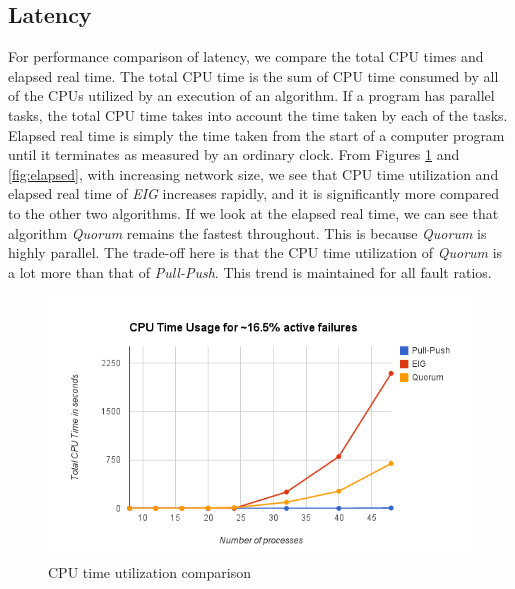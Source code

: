 \subsection{Latency}

For performance comparison of latency, we compare the total CPU times and elapsed real time.  The total CPU time is the sum of CPU time consumed by all of the CPUs utilized by an execution of an algorithm. If a program has parallel tasks, the total CPU time takes into account the time taken by each of the tasks. Elapsed real time is simply the time taken from the start of a computer program until it terminates as measured by an ordinary clock. From Figures \ref{fig:cpu} and \ref{fig:elapsed}, with increasing network size, we see that CPU time utilization and elapsed real time of \textit{EIG} increases rapidly, and it is significantly more compared to the other two algorithms. If we look at the elapsed real time, we can see that algorithm \textit{Quorum} remains the fastest throughout. This is because \textit{Quorum} is highly parallel. The trade-off here is that the CPU time utilization of \textit{Quorum} is a lot more than that of \textit{Pull-Push}. This trend is maintained for all fault ratios.

\begin{figure}[ht]
 \centering
\vspace{-3mm}
\includegraphics[scale=0.4]{cpu16}
\vspace{-2mm}
\caption{CPU time utilization comparison}
 \label{fig:cpu}
\vspace{-4mm}
\end{figure}

